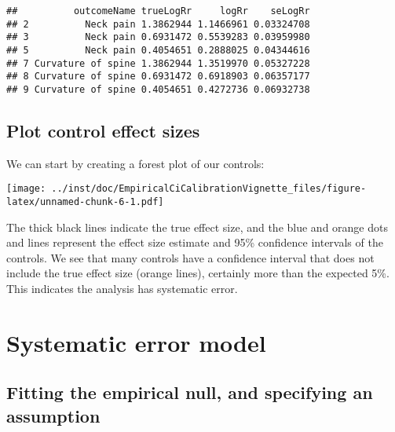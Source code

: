\documentclass[]{article}
\newenvironment{Shaded}{\begin{snugshade}}{\end{snugshade}}
\newcommand{\KeywordTok}[1]{\textcolor[rgb]{0.13,0.29,0.53}{\textbf{#1}}}
\newcommand{\NormalTok}[1]{#1}
\newcommand{\OperatorTok}[1]{\textcolor[rgb]{0.81,0.36,0.00}{\textbf{#1}}}
\newcommand{\StringTok}[1]{\textcolor[rgb]{0.31,0.60,0.02}{#1}}
\begin{document}
\begin{verbatim}
##          outcomeName trueLogRr     logRr    seLogRr
## 2          Neck pain 1.3862944 1.1466961 0.03324708
## 3          Neck pain 0.6931472 0.5539283 0.03959980
## 5          Neck pain 0.4054651 0.2888025 0.04344616
## 7 Curvature of spine 1.3862944 1.3519970 0.05327228
## 8 Curvature of spine 0.6931472 0.6918903 0.06357177
## 9 Curvature of spine 0.4054651 0.4272736 0.06932738
\end{verbatim}

\hypertarget{plot-control-effect-sizes}{%
\subsection{Plot control effect sizes}\label{plot-control-effect-sizes}}

We can start by creating a forest plot of our controls:

\begin{Shaded}
\end{Shaded}

\texttt{[image: ../inst/doc/EmpiricalCiCalibrationVignette\_files/figure-latex/unnamed-chunk-6-1.pdf]}

The thick black lines indicate the true effect size, and the blue and
orange dots and lines represent the effect size estimate and 95\%
confidence intervals of the controls. We see that many controls have a
confidence interval that does not include the true effect size (orange
lines), certainly more than the expected 5\%. This indicates the
analysis has systematic error.

\hypertarget{systematic-error-model}{%
\section{Systematic error model}\label{systematic-error-model}}

\hypertarget{fitting-the-empirical-null-and-specifying-an-assumption}{%
\subsection{Fitting the empirical null, and specifying an
assumption}\label{fitting-the-empirical-null-and-specifying-an-assumption}}
\end{document}

